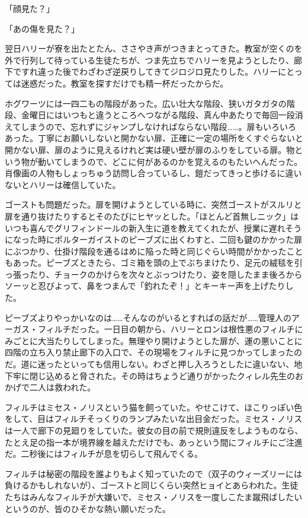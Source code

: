 \documentclass[10pt,a4paper]{article}
\begin{document}
\begin{CJK}{UTF8}{min}
「顔見た？」

「あの傷を見た？」

翌日ハリーが寮を出たとたん、ささやき声がつきまとってきた。教室が空くのを外で行列して待っている生徒たちが、つま先立ちでハリーを見ようとしたり、廊下ですれ違った後でわざわざ逆戻りしてきてジロジロ見たりした。ハリーにとっては迷惑だった。教室を探すだけでも精一杯だったからだ。

ホグワーツには一四二もの階段があった。広い壮大な階段、狭いガタガタの階段、金曜日にはいつもと違うところへつながる階段、真ん中あたりで毎回一段消えてしまうので、忘れずにジャンプしなければならない階段……。扉もいろいろあった。丁寧にお願いしないと開かない扉、正確に一定の場所をくすぐらないと開かない扉、扉のように見えるけれど実は硬い壁が扉のふりをしている扉。物という物が動いてしまうので、どこに何があるのかを覚えるのもたいへんだった。肖像画の人物もしょっちゅう訪問し合っているし、鎧だってきっと歩けるに違いないとハリーは確信していた。

ゴーストも問題だった。扉を開けようとしている時に、突然ゴーストがスルリと扉を通り抜けたりするとそのたびにヒヤッとした。「ほとんど首無しニック」はいつも喜んでグリフィンドールの新入生に道を教えてくれたが、授業に遅れそうになった時にポルターガイストのピーブズに出くわすと、二回も鍵のかかった扉にぶつかり、仕掛け階段を通るはめに陥った時と同じぐらい時間がかかったこともあった。ピーブズときたら、ゴミ箱を頭の上でぶちまけたり、足元の絨毯を引っ張ったり、チョークのかけらを次々とぶっつけたり、姿を隠したまま後ろからソーッと忍びよって、鼻をつまんで「釣れたぞ！」とキーキー声を上げたりした。

ピーブズよりやっかいなのは……そんなのがいるとすればの話だが……管理人のアーガス・フィルチだった。一日目の朝から、ハリーとロンは根性悪のフィルチにみごとに大当たりしてしまった。無理やり開けようとした扉が、運の悪いことに四階の立ち入り禁止廊下の入口で、その現場をフィルチに見つかってしまったのだ。道に迷ったといっても信用しない。わざと押し入ろうとしたに違いない、地下牢に閉じ込めると脅された。その時はちょうど通りがかったクィレル先生のおかげで二人は救われた。

フィルチはミセス・ノリスという猫を飼っていた。やせこけて、ほこりっぽい色をして、目はフィルチそっくりのランプみたいな出目金だった。ミセス・ノリスは一人で廊下の見廻りをしていた。彼女の目の前で規則違反をしようものなら、たとえ足の指一本が境界線を越えただけでも、あっという間にフィルチにご注進だ。二秒後にはフィルチが息を切らして飛んでくる。

フィルチは秘密の階段を誰よりもよく知っていたので（双子のウィーズリーには負けるかもしれないが）、ゴーストと同じくらい突然ヒョイとあらわれた。生徒たちはみんなフィルチが大嫌いで、ミセス・ノリスを一度しこたま蹴飛ばしたいというのが、皆のひそかな熱い願いだった。


\end{CJK}
\end{document}
